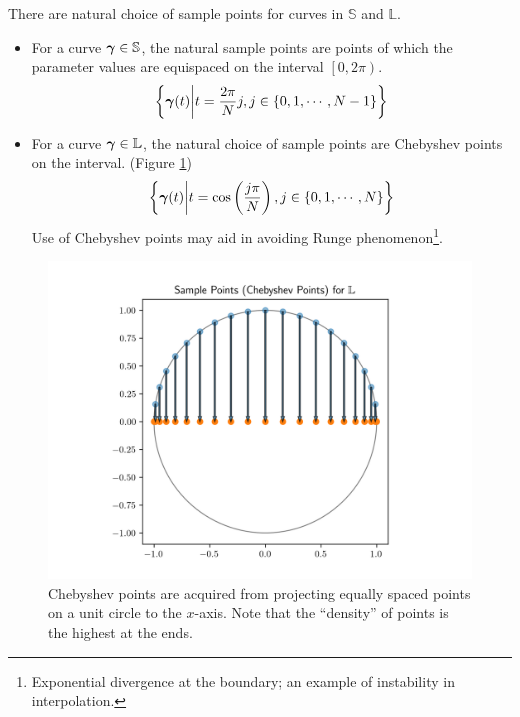 \documentclass[../dissertation.tex]{subfiles}
\begin{document}
There are natural choice of sample points for curves in $\mathbb{S}$ and $\mathbb{L}$.
\begin{itemize}
    \item For a curve $\boldsymbol{\gamma} \in \mathbb{S}$, the natural sample points are points of which the parameter values are equispaced on the interval $\left[ 0,2\pi \right)$.
        \begin{equation}
\left\{ \boldsymbol{\gamma}(t) \middle| t = \frac{2\pi}{N}j, j \in \left\{ 0, 1, \cdots, N-1 \right\} \right\}
        \end{equation}
    \item For a curve $\boldsymbol{\gamma} \in \mathbb{L}$, the natural choice of sample points are Chebyshev points on the interval. (Figure \ref{fig: Chebyshev Points})
        \begin{equation}
            \left\{ \boldsymbol{\gamma}(t) \middle| t = \cos \left( \frac{j \pi}{N} \right), j \in \left\{ 0, 1, \cdots, N \right\} \right\}
        \end{equation}
        Use of Chebyshev points may aid in avoiding Runge phenomenon\footnote{Exponential divergence at the boundary; an example of instability in interpolation.}\cite{Trefethen_2020}.
\end{itemize}
\begin{figure}[tbp]
    \centering
    \includegraphics[width=\textwidth]{sections/FourierSeriesImgs/ChebyshevPoints}
    \caption{Chebyshev points are acquired from projecting equally spaced points on a unit circle to the $x$-axis.
    Note that the ``density'' of points is the highest at the ends.}
    \label{fig: Chebyshev Points}
\end{figure}
\end{document}
